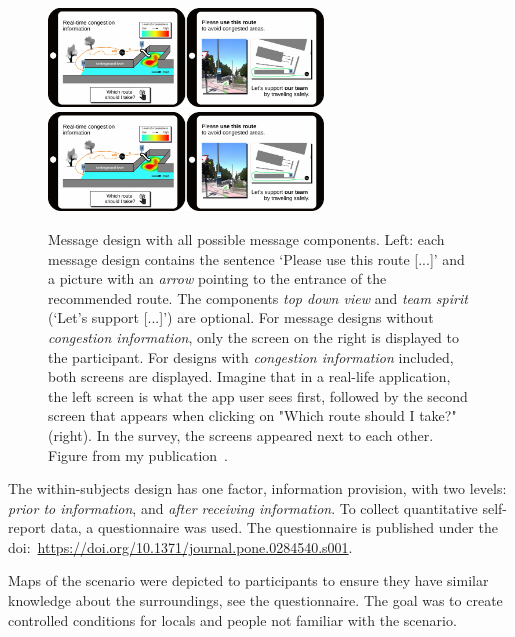\begin{figure}[H]
\includegraphics[width=7.3cm,clip,trim={8.1cm 0cm 0cm 0cm}]{figures/investigation/Nachrichtengestaltung/design2.pdf}
\includegraphics[width=7.3cm,clip,trim={0cm 0cm 8.1cm 0cm}]{figures/investigation/Nachrichtengestaltung/design2.pdf}
\caption[Message design with all possible message components.]{Message design with all possible message components. Left: each message design contains the sentence `Please use this route [...]' and a picture with an \textit{arrow} pointing to the entrance of the recommended route. The components \textit{top down view} and \textit{team spirit} (`Let's support [...]') are optional.  For message designs without  \textit{congestion information}, only the screen on the right is displayed to the participant.
For designs with \textit{congestion information} included, both screens are displayed. Imagine that in a real-life application, the left screen is what the app user sees first, followed by the second screen that appears when clicking on "Which route should I take?" (right). In the survey, the screens appeared next to each other. Figure from my publication~\cite{mayr-2023-cdyn}.}
\label{fig:detailviewmessagedesign}
\end{figure}



The within-subjects design has one factor, information provision, with two levels: \textit{prior to information}, and \textit{after receiving information}. To collect quantitative self-report data, a questionnaire was used.  The questionnaire is published under the doi:~\url{https://doi.org/10.1371/journal.pone.0284540.s001}. 


Maps of the scenario were depicted to participants to ensure they have similar knowledge about the surroundings, see the questionnaire. The goal was to create controlled conditions for locals and people  not familiar with the scenario. 

